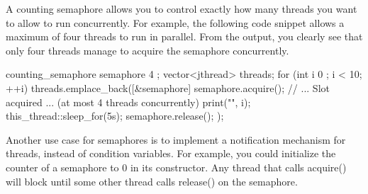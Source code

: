A counting semaphore allows you to control exactly how many threads you want to allow to run concurrently. For example, the following code snippet allows a maximum of four threads to run in parallel. From the output, you clearly see that only four threads manage to acquire the semaphore concurrently.

\begin{cpp}
counting_semaphore semaphore { 4 };
vector<jthread> threads;
for (int i { 0 }; i < 10; ++i) {
    threads.emplace_back([&semaphore] {
        semaphore.acquire();
        // ... Slot acquired ... (at most 4 threads concurrently)
        print("{}", i);
        this_thread::sleep_for(5s);
        semaphore.release();
    });
}
\end{cpp}

Another use case for semaphores is to implement a notification mechanism for threads, instead of condition variables. For example, you could initialize the counter of a semaphore to 0 in its constructor. Any thread that calls acquire() will block until some other thread calls release() on the semaphore.
